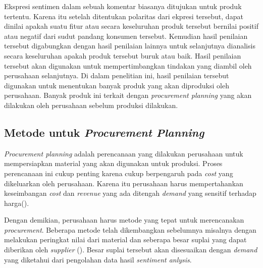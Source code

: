 \documentclass[]{article}
\begin{document}
\begin{spacing}{1.5}
Ekspresi sentimen dalam sebuah komentar biasanya ditujukan untuk produk tertentu. Karena itu setelah 
ditentukan polaritas dari ekpresi tersebut, dapat dinilai apakah suatu fitur atau secara keseluruhan 
produk tersebut bernilai positif atau negatif dari sudut pandang konsumen tersebut. Kemudian hasil penilaian
tersebut digabungkan dengan hasil penilaian lainnya untuk selanjutnya dianalisis secara keseluruhan apakah
produk tersebut buruk atau baik. Hasil penilaian tersebut akan digunakan untuk mempertimbangkan 
tindakan yang diambil oleh perusahaan selanjutnya. Di dalam penelitian ini, hasil penilaian tersebut
digunakan untuk menentukan banyak produk yang akan diproduksi oleh perusahaan. Banyak produk ini 
terkait dengan \textit{procurement planning} yang akan dilakukan oleh perusahaan sebelum produksi dilakukan.

\subsection{Metode untuk \textit{Procurement Planning}}
\textit{Procurement planning} adalah perencanaan yang dilakukan perusahaan untuk mempersiapkan material 
yang akan digunakan untuk produksi. Proses perencanaan ini cukup penting karena cukup berpengaruh pada 
\textit{cost} yang dikeluarkan oleh perusahaan. Karena itu perusahaan harus mempertahankan keseimbangan \textit{cost}
dan \textit{revenue} yang ada ditengah \textit{demand} yang sensitif terhadap harga(\cite{Geu2009390}).

Dengan demikian, perusahaan harus metode yang tepat untuk merencanakan \textit{procurement}. Beberapa
metode telah dikembangkan sebelumnya misalnya dengan melakukan peringkat nilai dari material dan
seberapa besar suplai yang dapat diberikan oleh \textit{supplier} (\cite{Sun201097}). Besar suplai tersebut
akan disesuaikan dengan \textit{demand} yang diketahui dari pengolahan data hasil \textit{sentiment anlysis}.
\newpage

\renewcommand{\refname}{Daftar Pustaka}
\printbibliography

\end{spacing}
\end{document}
